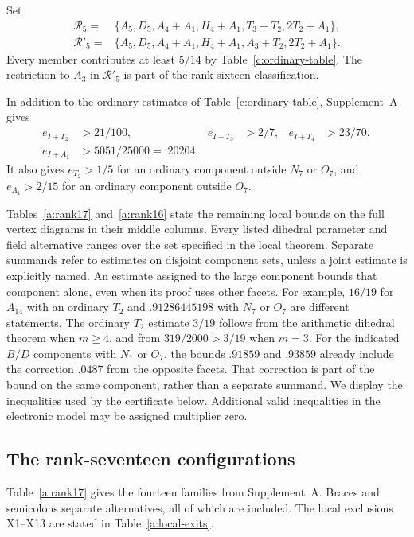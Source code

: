 \documentclass[11pt]{article}
\theoremstyle{definition}
\theoremstyle{remark}
\numberwithin{equation}{section}
\begin{document}
Set
\begin{align*}
\mathcal R_5={}&\{A_5,D_5,A_4+A_1,H_4+A_1,
                   T_3+T_2,2T_2+A_1\},\\
\mathcal R'_5={}&\{A_5,D_5,A_4+A_1,H_4+A_1,
                   A_3+T_2,2T_2+A_1\}.
\end{align*}
Every member contributes at least $5/14$ by
Table~\ref{c:ordinary-table}. The restriction to $A_3$ in
$\mathcal R'_5$ is part of the rank-sixteen classification.

In addition to the ordinary estimates of
Table~\ref{c:ordinary-table}, Supplement~A gives
\begin{align}
 e_{I+T_2}&>21/100,& e_{I+T_3}&>2/7,&
 e_{I+T_4}&>23/70,\label{a:I-joints}\\
 e_{I+A_1}&>5051/25000=.20204.\label{a:I-A1}
\end{align}
It also gives $e_{T_2}>1/5$ for an ordinary component outside
$N_7$ or $O_7$, and $e_{A_1}>2/15$ for an ordinary component
outside $O_7$.

Tables~\ref{a:rank17} and~\ref{a:rank16} state the remaining local
bounds on the full vertex diagrams in their middle columns. Every
listed dihedral parameter and field alternative ranges over the set
specified in the local theorem. Separate summands refer to estimates
on disjoint component sets, unless a joint estimate is explicitly
named. An estimate assigned to the large component bounds that
component alone, even when its proof uses other facets. For example,
$16/19$ for $A_{14}$ with an ordinary $T_2$ and
$.91286445198$ with $N_7$ or $O_7$ are different statements.
The ordinary $T_2$ estimate $3/19$ follows from the arithmetic
dihedral theorem when $m\ge4$, and from $319/2000>3/19$ when
$m=3$. For the indicated $B/D$ components with $N_7$ or $O_7$,
the bounds $.91859$ and $.93859$ already include the correction
$.0487$ from the opposite facets. That correction is part of the
bound on the same component, rather than a separate summand.
We display the inequalities used by the certificate below. Additional
valid inequalities in the electronic model may be assigned multiplier
zero.

\subsection{The rank-seventeen configurations}
\label{a:rank17-section}

Table~\ref{a:rank17} gives the fourteen families from Supplement~A.
Braces and semicolons separate alternatives, all of which are included.
The local exclusions X1--X13 are stated in Table~\ref{a:local-exits}.
\end{document}
